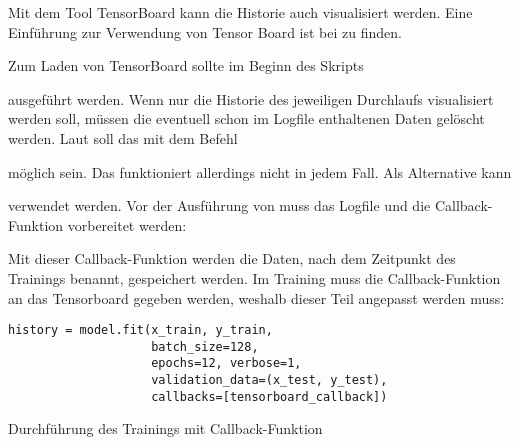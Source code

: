 Mit dem Tool TensorBoard kann die Historie auch visualisiert werden. Eine Einführung zur Verwendung von Tensor Board ist bei \cite{TensorFlow.30.10.2020} zu finden.

Zum Laden von TensorBoard sollte im Beginn des Skripts

\medskip


\medskip

ausgeführt werden. Wenn nur die Historie des jeweiligen Durchlaufs visualisiert werden soll, müssen die eventuell schon im Logfile
enthaltenen Daten gelöscht werden. Laut \cite{TensorFlow.30.10.2020} soll das mit dem Befehl

\medskip


\medskip

möglich sein. Das funktioniert allerdings nicht in jedem Fall. Als Alternative kann 

\medskip



\medskip

verwendet werden. Vor der Ausführung von  muss das Logfile und die Callback-Funktion vorbereitet werden:

\medskip




\medskip

Mit dieser Callback-Funktion werden die Daten,  nach dem Zeitpunkt des Trainings benannt, gespeichert werden. Im Training muss die Callback-Funktion an das Tensorboard gegeben werden, weshalb dieser Teil angepasst werden muss:


\begin{code}
    \begin{lstlisting}[numbers=none]
history = model.fit(x_train, y_train,
                    batch_size=128,
                    epochs=12, verbose=1,
                    validation_data=(x_test, y_test),
                    callbacks=[tensorboard_callback])
\end{lstlisting}
    
    \caption{Durchführung des Trainings mit Callback-Funktion}
\end{code}


